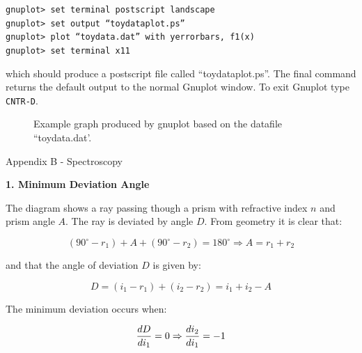\documentclass[12pt]{article}
\newcommand{\degree}{^\circ}
\begin{document}
{\tt gnuplot> set terminal postscript landscape}\\
{\tt gnuplot> set output ``toydataplot.ps''}\\
{\tt gnuplot> plot ``toydata.dat'' with yerrorbars, f1(x)}\\
{\tt gnuplot> set terminal x11}

which should produce a postscript file called ``toydataplot.ps''. The
final command returns the default output to the normal Gnuplot
window. To exit Gnuplot type {\tt CNTR-D}.

\begin{figure}
\centerline{}
\caption{Example graph produced 
by gnuplot based on the datafile ``toydata.dat'.}
\end{figure}


\newpage
\pagestyle{empty}

\centerline{\hspace{-2cm}  \Huge Appendix B - Spectroscopy}

\begin{center}
{\large {\bf 1. Minimum Deviation Angle}}
\end{center}
\centerline{}

The diagram shows a ray passing though a prism with refractive index $n$ and prism angle $A$. The ray is deviated by angle $D$. From geometry it is clear that:\\
\begin{center}
\begin{equation}
(90 \degree - r_1) + A + (90\degree - r_2)=180\degree 
\Rightarrow A=r_1 + r_2
\end{equation}
\end{center}
and that the angle of deviation $D$ is given by:
\begin{center}
\begin{equation}
D=(i_1 - r_1) + (i_2 - r_2) = i_1 + i_2 - A
\end{equation}
\end{center}
The minimum deviation occurs when:
\begin{center}
\begin{equation}
{\Large
\frac{dD}{d i_1}=0 \Rightarrow \frac{d i_2}{d i_1}=-1
}
\end{equation}
\end{center}
\end{document}
